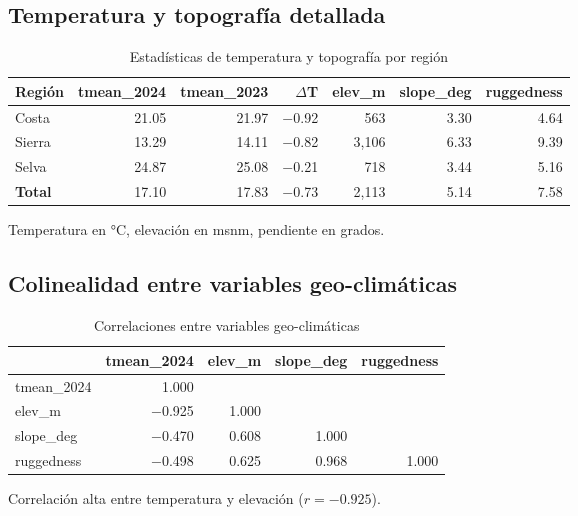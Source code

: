 \documentclass[11pt,a4paper]{article}
\begin{document}
\subsection{Temperatura y topografía detallada}

\begin{table}[H]
\centering
\caption{Estadísticas de temperatura y topografía por región}
\label{tab:temp_topo_detail}
\begin{threeparttable}
\small
\begin{tabular}{lrrrrrr}
\toprule
\textbf{Región} & \textbf{tmean\_2024} & \textbf{tmean\_2023} & \textbf{$\Delta$T} & \textbf{elev\_m} & \textbf{slope\_deg} & \textbf{ruggedness} \\
\midrule
Costa & 21.05 & 21.97 & $-$0.92 & 563 & 3.30 & 4.64 \\
Sierra & 13.29 & 14.11 & $-$0.82 & 3,106 & 6.33 & 9.39 \\
Selva & 24.87 & 25.08 & $-$0.21 & 718 & 3.44 & 5.16 \\
\midrule
\textbf{Total} & 17.10 & 17.83 & $-$0.73 & 2,113 & 5.14 & 7.58 \\
\bottomrule
\end{tabular}
\begin{tablenotes}
\footnotesize
\item Temperatura en °C, elevación en msnm, pendiente en grados.
\end{tablenotes}
\end{threeparttable}
\end{table}

\subsection{Colinealidad entre variables geo-climáticas}

\begin{table}[H]
\centering
\caption{Correlaciones entre variables geo-climáticas}
\label{tab:geo_correlations}
\begin{threeparttable}
\small
\begin{tabular}{lrrrr}
\toprule
& \textbf{tmean\_2024} & \textbf{elev\_m} & \textbf{slope\_deg} & \textbf{ruggedness} \\
\midrule
tmean\_2024 & 1.000 & & & \\
elev\_m & $-$0.925 & 1.000 & & \\
slope\_deg & $-$0.470 & 0.608 & 1.000 & \\
ruggedness & $-$0.498 & 0.625 & 0.968 & 1.000 \\
\bottomrule
\end{tabular}
\begin{tablenotes}
\footnotesize
\item Correlación alta entre temperatura y elevación ($r=-0.925$).
\end{tablenotes}
\end{threeparttable}
\end{table}
\end{document}
